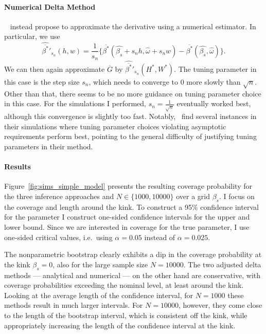 \documentclass[12pt,a4paper,english]{article} %
\numberwithin{equation}{section}
\theoremstyle{definition}
\theoremstyle{remark}
\theoremstyle{plain}
\begin{document}
\paragraph{Numerical Delta Method}
~\cite{hong2018numerical} instead propose to approximate the derivative using a numerical estimator.
In particular, we use
\begin{equation*}
  \hat{\overline{\beta^*}}'_{s_n}(h, w) = \frac{1}{s_n} \{\overline{\beta^*}(\hat{\beta_s} + s_n h, \hat{\omega} + s_n w) - \overline{\beta^*}({\hat{\beta_s}, \hat{\omega}})\}.
\end{equation*}
We can then again approximate $\overline{G}$ by $\hat{\overline{\beta^*}}'_{s_n}(H^*, W^*)$.
The tuning parameter in this case is the step size $s_n$, which needs to converge to $0$ more slowly than $\sqrt{n}$.
Other than that, there seems to be no more guidance on tuning parameter choice in this case.
For the simulations I performed, $s_n = \frac{1}{\sqrt{n}}$ eventually worked best, although this convergence is slightly too fast.
Notably,~\cite{hong2018numerical} find several instances in their simulations where tuning parameter choices violating asymptotic requirements perform best, pointing to the general difficulty of justifying tuning parameters in their method.

\paragraph{Results}
Figure~\ref{fig:sims_simple_model} presents the resulting coverage probability for the three inference approaches and $N\in\{1000, 10000\}$ over a grid $\beta_s$.
I focus on the coverage and length around the kink. To construct a 95\% confidence interval for the parameter I construct one-sided confidence intervals for the upper and lower bound.
Since we are interested in coverage for the true parameter, I use one-sided critical values, i.e.\ using $\alpha=0.05$ instead of $\alpha=0.025$.

The nonparametric bootstrap clearly exhibits a dip in the coverage probability at the kink $\beta_s = 0$, also for the large sample size $N=10000$.
The two adjusted delta methods --- analytical and numerical --- on the other hand are conservative, with coverage probabilities exceeding the nominal level, at least around the kink.
Looking at the average length of the confidence interval, for $N=1000$ these methods result in much larger intervals.
For $N=10000$, however, they come close to the length of the bootstrap interval, which is consistent off the kink, while appropriately increasing the length of the confidence interval at the kink.
\end{document}
